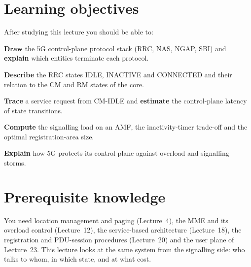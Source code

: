 \documentclass[11pt,a4paper]{article}
\begin{document}
\ACNcover

\section{Learning objectives}
After studying this lecture you should be able to:
\begin{objectives}
  \item \textbf{Draw} the 5G control-plane protocol stack (RRC, NAS, NGAP, SBI) and \textbf{explain} which entities terminate each protocol.
  \item \textbf{Describe} the RRC states IDLE, INACTIVE and CONNECTED and their relation to the CM and RM states of the core.
  \item \textbf{Trace} a service request from CM-IDLE and \textbf{estimate} the control-plane latency of state transitions.
  \item \textbf{Compute} the signalling load on an AMF, the inactivity-timer trade-off and the optimal registration-area size.
  \item \textbf{Explain} how 5G protects its control plane against overload and signalling storms.
\end{objectives}

\section{Prerequisite knowledge}
You need location management and paging (Lecture~4), the MME and its overload control (Lecture~12), the service-based architecture
(Lecture~18), the registration and PDU-session procedures (Lecture~20) and the user plane of Lecture~23. This lecture looks at the same
system from the signalling side: who talks to whom, in which state, and at what cost.
\end{document}
